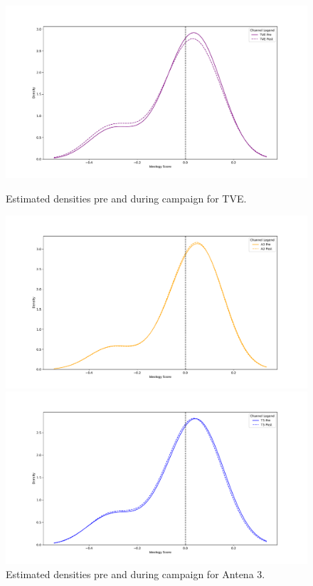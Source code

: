 \documentclass[12pt]{article}
\begin{document}
\begin{figure}[ht] 
	\label{ fig7} 
	\begin{minipage}[b]{0.5\linewidth}
		\centering
		\includegraphics[width=1\linewidth]{figures/channel_ideology_density_python_channel_0.pdf} 
        \caption{Estimated densities pre and during campaign for TVE.}
		\vspace{4ex}
	\end{minipage}%
	\begin{minipage}[b]{0.5\linewidth}
		\centering
		\includegraphics[width=1\linewidth]{figures/channel_ideology_density_python_channel_1.pdf} 
		\caption{Estimated densities pre and during campaign for Antena 3.} 
		\vspace{4ex}
	\end{minipage} 
	\begin{minipage}[b]{0.5\linewidth}
		\centering
		\includegraphics[width=1\linewidth]{figures/channel_ideology_density_python_channel_2.pdf} 

\end{minipage}
\end{figure}
\end{document}
